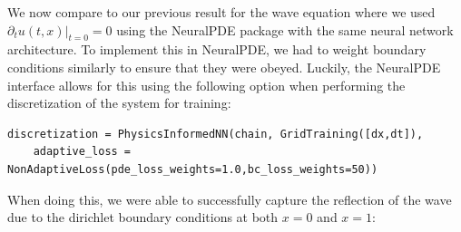 \documentclass[11pt]{article}
\newcommand{\1}{\mathbf 1}
\begin{document}
We now compare to our previous result for the wave equation where we used $\left.\partial_t u(t,x) \right|_{t = 0} = 0$ using the NeuralPDE package with the same neural network architecture.
To implement this in NeuralPDE, we had to weight boundary conditions similarly to ensure that they were obeyed.
Luckily, the NeuralPDE interface allows for this using the following option when performing the discretization of the system for training:
\begin{singlespace}	
\begin{verbatim}
discretization = PhysicsInformedNN(chain, GridTraining([dx,dt]),
	adaptive_loss = NonAdaptiveLoss(pde_loss_weights=1.0,bc_loss_weights=50))
\end{verbatim}
\end{singlespace}
When doing this, we were able to successfully capture the reflection of the wave due to the dirichlet boundary conditions at both $x = 0$ and $x = 1$:
\end{document}
